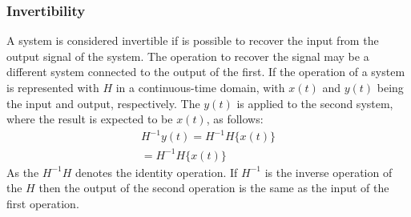 \subsubsection*{Invertibility}
A system is considered invertible if is possible to recover the input from the output signal of the system. The operation to recover the signal may be a different system connected to the output of the first. If the operation of a system is represented with $H$ in a continuous-time domain, with $x(t)$ and $y(t)$ being the input and output, respectively. The $y(t)$ is applied to the second system, where the result is expected to be $x(t)$, as follows:
\begin{equation}
    \begin{aligned}
        H^{-1}{y(t)} = H^{-1}{H\{x(t)\}}\\
        = H^{-1}H\{x(t)\}    
    \end{aligned}
\end{equation} 
As the $H^{-1}H$ denotes the identity operation. If $H^{-1}$ is the inverse operation of the $H$ then the output of the second operation is the same as the input of the first operation.

